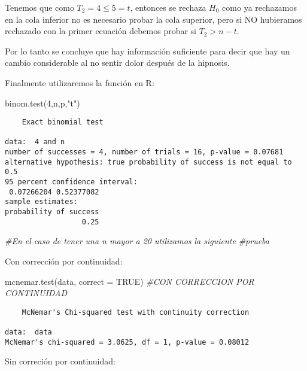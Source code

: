 \documentclass[
  a4paper,
  oneside,
  openany]{book}
\newenvironment{Shaded}{\begin{snugshade}}{\end{snugshade}}
\newcommand{\AttributeTok}[1]{\textcolor[rgb]{0.77,0.63,0.00}{#1}}
\newcommand{\CommentTok}[1]{\textcolor[rgb]{0.56,0.35,0.01}{\textit{#1}}}
\newcommand{\ConstantTok}[1]{\textcolor[rgb]{0.00,0.00,0.00}{#1}}
\newcommand{\DecValTok}[1]{\textcolor[rgb]{0.00,0.00,0.81}{#1}}
\newcommand{\FunctionTok}[1]{\textcolor[rgb]{0.00,0.00,0.00}{#1}}
\newcommand{\NormalTok}[1]{#1}
\newcommand{\StringTok}[1]{\textcolor[rgb]{0.31,0.60,0.02}{#1}}
\begin{document}
Tenemos que como \(T_2=4\leq 5 =t\), entonces se rechaza \(H_0\) como ya rechazamos en la cola inferior no es necesario probar la cola superior, pero si NO hubieramos rechazado con la primer ecuación debemos probar si \(T_2>n-t\).

Por lo tanto se concluye que hay información suficiente para decir que hay un cambio considerable al no sentir dolor después de la hipnosis.

Finalmente utilizaremos la función en R:

\begin{Shaded}
\begin{Highlighting}[]
\FunctionTok{binom.test}\NormalTok{(}\DecValTok{4}\NormalTok{,n,p,}\StringTok{"t"}\NormalTok{)}
\end{Highlighting}
\end{Shaded}

\begin{verbatim}
    Exact binomial test

data:  4 and n
number of successes = 4, number of trials = 16, p-value = 0.07681
alternative hypothesis: true probability of success is not equal to 0.5
95 percent confidence interval:
 0.07266204 0.52377082
sample estimates:
probability of success 
                  0.25 
\end{verbatim}

\begin{Shaded}
\begin{Highlighting}[]
\CommentTok{\#En el caso de tener una n mayor a 20 utilizamos la siguiente}
\CommentTok{\#prueba}
\end{Highlighting}
\end{Shaded}

Con corrección por continuidad:

\begin{Shaded}
\begin{Highlighting}[]
\FunctionTok{mcnemar.test}\NormalTok{(data, }\AttributeTok{correct =} \ConstantTok{TRUE}\NormalTok{) }\CommentTok{\#CON CORRECCION POR CONTINUIDAD}
\end{Highlighting}
\end{Shaded}

\begin{verbatim}
    McNemar's Chi-squared test with continuity correction

data:  data
McNemar's chi-squared = 3.0625, df = 1, p-value = 0.08012
\end{verbatim}

Sin correción por continuidad:
\end{document}
